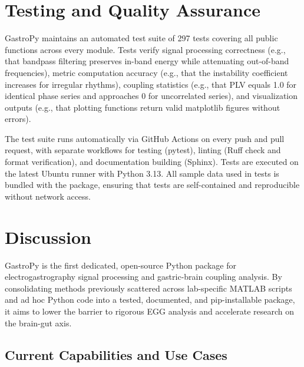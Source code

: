 \documentclass[12pt]{article}
\begin{document}
\section{Testing and Quality Assurance}

GastroPy maintains an automated test suite of 297 tests covering
all public functions across every module. Tests verify signal processing
correctness (e.g., that bandpass filtering preserves in-band energy while
attenuating out-of-band frequencies), metric computation accuracy (e.g., that
the instability coefficient increases for irregular rhythms), coupling
statistics (e.g., that PLV equals 1.0 for identical phase series and
approaches 0 for uncorrelated series), and visualization outputs (e.g., that
plotting functions return valid matplotlib figures without errors).

The test suite runs automatically via GitHub Actions on every push and pull
request, with separate workflows for testing (pytest), linting (Ruff check and
format verification), and documentation building (Sphinx). Tests are executed
on the latest Ubuntu runner with Python 3.13. All sample data used in tests is
bundled with the package, ensuring that tests are self-contained and
reproducible without network access.

\section{Discussion}

GastroPy is the first dedicated, open-source Python package for
electrogastrography signal processing and gastric-brain coupling analysis. By
consolidating methods previously scattered across lab-specific
MATLAB scripts and ad hoc Python code into a tested, documented, and
pip-installable package, it aims to lower the barrier to rigorous EGG
analysis and accelerate research on the brain-gut axis.

\subsection{Current Capabilities and Use Cases}
\end{document}

